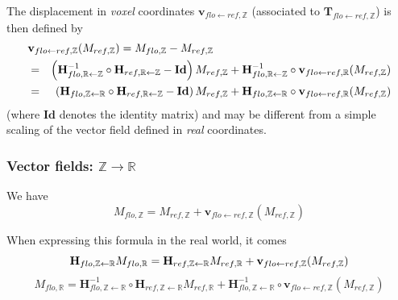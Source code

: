The displacement in \textit{voxel} coordinates $\mathbf{v}_{flo \leftarrow ref,\mathbb{Z}}$ (associated to $\mathbf{T}_{flo \leftarrow ref,\mathbb{Z}}$) is then defined by
\begin{eqnarray*}
\lefteqn{\mathbf{v}_{flo \leftarrow ref,\mathbb{Z}}( M_{ref,\mathbb{Z}} )
 =  M_{flo,\mathbb{Z}} - M_{ref,\mathbb{Z}}} \\
& = & 
\left( \mathbf{H}^{-1}_{flo, \mathbb{R} \leftarrow \mathbb{Z}}
 \circ \mathbf{H}_{ref, \mathbb{R} \leftarrow \mathbb{Z}} - \mathbf{Id} \right)
 M_{ref,\mathbb{Z}}
 + \mathbf{H}^{-1}_{flo, \mathbb{R} \leftarrow \mathbb{Z}}
 \circ \mathbf{v}_{flo \leftarrow ref,\mathbb{R}}( M_{ref,\mathbb{Z}} ) \\
 & = & 
\left( \mathbf{H}_{flo, \mathbb{Z} \leftarrow \mathbb{R}}
 \circ \mathbf{H}_{ref, \mathbb{R} \leftarrow \mathbb{Z}} - \mathbf{Id} \right)
 M_{ref,\mathbb{Z}}
 + \mathbf{H}_{flo, \mathbb{Z} \leftarrow \mathbb{R}}
 \circ \mathbf{v}_{flo \leftarrow ref,\mathbb{R}}( M_{ref,\mathbb{Z}} ) \\
\end{eqnarray*}
(where $\mathbf{Id}$ denotes the identity matrix) and may be different from a simple scaling of the vector field defined in \textit{real} coordinates.

\subsubsection{Vector fields: $\mathbb{Z} \rightarrow \mathbb{R}$}

We have 
\begin{displaymath}
M_{flo,\mathbb{Z}} = M_{ref,\mathbb{Z}} 
+ \mathbf{v}_{flo \leftarrow ref,\mathbb{Z}}( M_{ref,\mathbb{Z}} )
\end{displaymath}

When expressing this formula in the real world, it comes
\begin{displaymath}
\mathbf{H}_{flo, \mathbb{Z} \leftarrow \mathbb{R}} 
M_{flo,\mathbb{R}}
=
\mathbf{H}_{ref, \mathbb{Z} \leftarrow \mathbb{R}} 
M_{ref,\mathbb{R}}
+ \mathbf{v}_{flo \leftarrow ref,\mathbb{Z}}( M_{ref,\mathbb{Z}} ) \\
\end{displaymath}
\begin{displaymath}
M_{flo,\mathbb{R}}
=
\mathbf{H}^{-1}_{flo, \mathbb{Z} \leftarrow \mathbb{R}}
\circ 
\mathbf{H}_{ref, \mathbb{Z} \leftarrow \mathbb{R}}
M_{ref,\mathbb{R}}
+ 
\mathbf{H}^{-1}_{flo, \mathbb{Z} \leftarrow \mathbb{R}}
\circ \mathbf{v}_{flo \leftarrow ref,\mathbb{Z}}( M_{ref,\mathbb{Z}} )
\end{displaymath}

